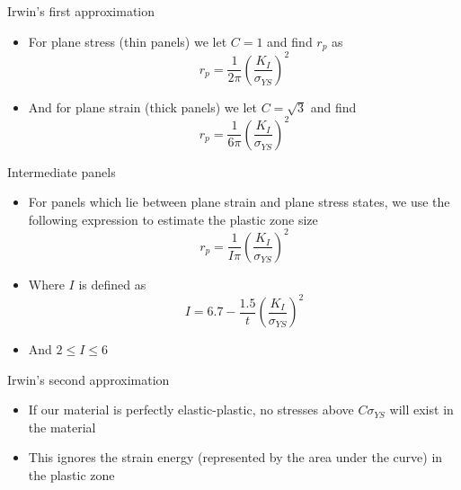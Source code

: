 \documentclass[10pt]{beamer}
\begin{document}
\begin{frame}{Irwin's first approximation}
	\begin{itemize}
		\item For plane stress (thin panels) we let $C=1$ and find $r_p$ as
		\begin{equation}
		r_p = \frac{1}{2\pi} \left(\frac{K_I}{\sigma_{YS}}\right)^2
		\end{equation}
		\pause
		\item And for plane strain (thick panels) we let $C=\sqrt{3}$ and find
		\begin{equation}
		r_p = \frac{1}{6\pi} \left(\frac{K_I}{\sigma_{YS}}\right)^2
		\end{equation}
	\end{itemize}
\end{frame}

\begin{frame}{Intermediate panels}
	\begin{itemize}
		\item For panels which lie between plane strain and plane stress states, we use the following expression to estimate the plastic zone size
		\begin{equation}
		r_p = \frac{1}{I\pi} \left(\frac{K_I}{\sigma_{YS}}\right)^2
		\end{equation}
		\pause
		\item Where $I$ is defined as
		\begin{equation}
		I = 6.7 - \frac{1.5}{t}\left(\frac{K_I}{\sigma_{YS}}\right)^2
		\end{equation}
		\item And $2 \le I \le 6$
	\end{itemize}
\end{frame}

\begin{frame}{Irwin's second approximation}
	\begin{itemize}
		\item If our material is perfectly elastic-plastic, no stresses above $C\sigma_{YS}$ will exist in the material
		\item This ignores the strain energy (represented by the area under the curve) in the plastic zone
	\end{itemize}
\end{frame}
\end{document}
